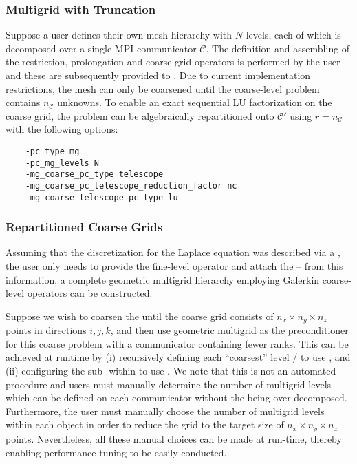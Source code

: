 \documentclass[]{siamart0216}
\begin{document}
\subsubsection{Multigrid with Truncation} \label{sec:truncation} 
Suppose a user defines their own mesh hierarchy with $N$ levels, each of which is decomposed over a single MPI communicator $\mathcal C$.
	The definition and assembling  of the restriction, prolongation and coarse grid operators is performed by the user
	and these are subsequently provided to .  
	Due to current implementation restrictions, the mesh can only be coarsened until the coarse-level problem 
	contains $n_{\mathcal C}$ unknowns. 
	To enable an exact sequential LU factorization on the coarse grid, the problem can be algebraically 
	repartitioned onto $\mathcal C'$ using $r = n_{\mathcal C}$ with the following options:
\begin{tcolorbox}[colframe=red,colback=cornsilk,boxrule=0.5pt,arc=4pt,
      left=-6pt,right=6pt,top=6pt,bottom=6pt,boxsep=0pt]
	\begin{verbatim}
    -pc_type mg
    -pc_mg_levels N
    -mg_coarse_pc_type telescope
    -mg_coarse_pc_telescope_reduction_factor nc
    -mg_coarse_telescope_pc_type lu
	\end{verbatim}
\end{tcolorbox}	


\subsubsection{Repartitioned Coarse Grids}
	Assuming that the discretization for the Laplace equation was described via a , 
	the user only needs to provide the fine-level operator and attach the  -- 
	from this information, a complete geometric multigrid hierarchy employing Galerkin 
	coarse-level operators can be constructed. 
	
	Suppose we wish to coarsen the  until the coarse grid consists of 
	$n_x \times n_y \times n_z$ points in directions $i, j, k$, and then use geometric 
	multigrid as the preconditioner for this coarse problem with a communicator containing fewer ranks.
	This can be achieved at runtime by (i) recursively defining each ``coarsest'' 
	level / to use , and (ii) configuring the sub- within  to use .
	We note that this is not an automated procedure and users must manually 
	determine the number of multigrid levels which can be defined on each communicator
	without the  being over-decomposed. 
	Furthermore, the user must manually choose the number of multigrid levels within each 
	 object in order to reduce the grid to the target size of $n_x \times n_y \times n_z$ points. Nevertheless,
    all these manual choices can be made at 
	run-time, thereby enabling performance tuning to be easily conducted.
	
\end{document}
